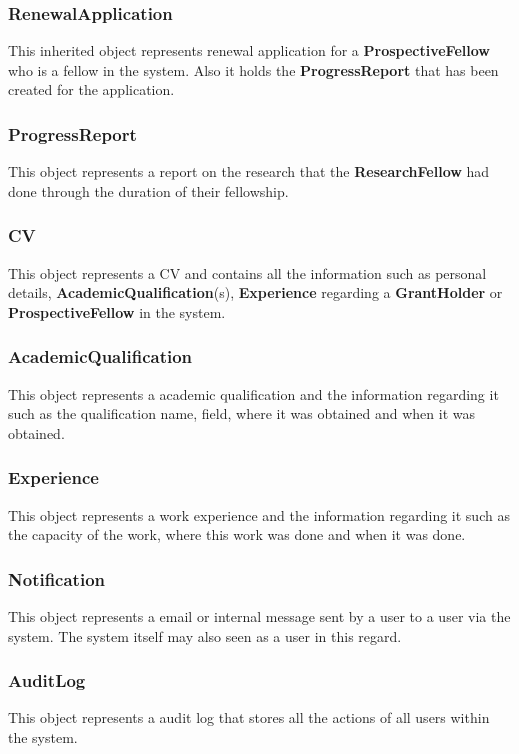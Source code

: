 \documentclass[12pt]{article}
\begin{document}
\subsubsection{RenewalApplication}
This inherited object represents renewal application for a \textbf{ProspectiveFellow} who is a fellow in the system. Also it holds the \textbf{ProgressReport} that has been created for the application.

\subsubsection{ProgressReport}
This object represents a report on the research that the \textbf{ResearchFellow} had done through the duration of their fellowship.

\subsubsection{CV}
This object represents a CV and contains all the information such as personal details, \textbf{AcademicQualification}(s), \textbf{Experience} regarding a \textbf{GrantHolder} or \textbf{ProspectiveFellow} in the system.

\subsubsection{AcademicQualification}
This object represents a academic qualification and the information regarding it such as the qualification name, field, where it was obtained and when it was obtained.

\subsubsection{Experience}
This object represents a work experience and the information regarding it such as the capacity of the work, where this work was done and when it was done.

\subsubsection{Notification}
This object represents a email or internal message sent by a user to a user via the system. The system itself may also seen as a user in this regard.

\subsubsection{AuditLog}
This object represents a audit log that stores all the actions of all users within the system.
\end{document}
